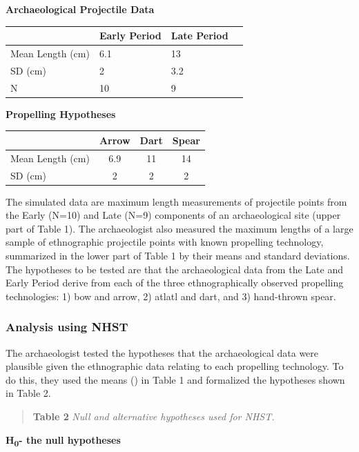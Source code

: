 \documentclass[
]{article}
\begin{document}
\textbf{Archaeological Projectile Data}

\begin{longtable}[]{@{}llll@{}}
\toprule
& Early Period & Late Period & \\
\midrule
\endhead
Mean Length (cm) & 6.1 & 13 & \\
SD (cm) & 2 & 3.2 & \\
N & 10 & 9 & \\
\bottomrule
\end{longtable}

\textbf{Propelling Hypotheses}

\begin{longtable}[]{@{}lccc@{}}
\toprule
& Arrow & Dart & Spear \\
\midrule
\endhead
Mean Length (cm) & 6.9 & 11 & 14 \\
SD (cm) & 2 & 2 & 2 \\
\bottomrule
\end{longtable}

The simulated data are maximum length measurements of projectile points
from the Early (N=10) and Late (N=9) components of an archaeological
site (upper part of Table 1). The archaeologist also measured the
maximum lengths of a large sample of ethnographic projectile points with
known propelling technology, summarized in the lower part of Table 1 by
their means and standard deviations. The hypotheses to be tested are
that the archaeological data from the Late and Early Period derive from
each of the three ethnographically observed propelling technologies: 1)
bow and arrow, 2) atlatl and dart, and 3) hand-thrown spear.

\hypertarget{analysis-using-nhst}{%
\subsubsection{Analysis using NHST}\label{analysis-using-nhst}}

The archaeologist tested the hypotheses that the archaeological data
were plausible given the ethnographic data relating to each propelling
technology. To do this, they used the means () in Table 1 and formalized
the hypotheses shown in Table 2.

\begin{quote}
\textbf{Table 2} \emph{Null and alternative hypotheses used for NHST.}
\end{quote}

\textbf{H\textsubscript{0}- the null hypotheses}
\end{document}
